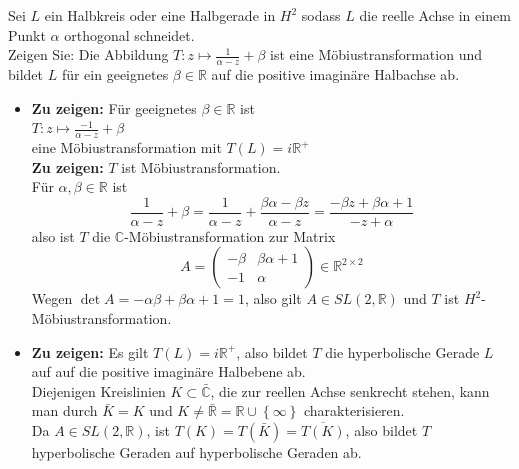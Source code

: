 \begin{assignment}
  Sei $L$ ein Halbkreis oder eine Halbgerade in $H^2$ sodass $L$ die reelle Achse in einem Punkt $\alpha$ orthogonal schneidet. \\
  Zeigen Sie: Die Abbildung $T: z \mapsto \frac{1}{\alpha - z} + \beta$ ist eine Möbiustransformation und bildet $L$  für ein geeignetes  $\beta \in \mathbb{R}$ auf die positive imaginäre Halbachse ab.
\end{assignment}
\begin{solution}
\begin{itemize}
  \item \textbf{Zu zeigen:} Für geeignetes \( \beta \in \mathbb{R} \) ist \\
  \( T: z \mapsto \frac{-1}{\alpha - z} + \beta \) \\
  eine Möbiustransformation mit \( T(L) = i \mathbb{R}^{+} \) \\
  \textbf{Zu zeigen:} \( T \) ist Möbiustransformation. \\
  Für \( \alpha, \beta \in \mathbb{R} \) ist
  \begin{equation*}
    \frac{1}{\alpha -z} + \beta = \frac{1}{\alpha-z} + \frac{\beta \alpha - \beta z}{\alpha - z} = \frac{-\beta z + \beta \alpha + 1}{-z +\alpha}
  \end{equation*} 
  also ist \( T \) die \( \mathbb{C} \)-Möbiustransformation zur Matrix
  \begin{equation*}
    A = \begin{pmatrix}
      - \beta & \beta \alpha + 1 \\
      - 1 & \alpha 
    \end{pmatrix} \in \mathbb{R}^{2 \times 2}
  \end{equation*}
  Wegen \( \det A = - \alpha \beta + \beta \alpha + 1 = 1 \), also gilt \( A \in SL(2, \mathbb{R}) \) und \( T \) ist \( H^2 \)-Möbiustransformation.
  \item   \textbf{Zu zeigen:} Es gilt \( T(L) = i \mathbb{R}^{+} \), also bildet \( T \) die hyperbolische Gerade \( L \) auf auf die positive imaginäre Halbebene ab. \\
  Diejenigen Kreislinien \( K \subset \bar{\mathbb{C}} \), die zur reellen Achse senkrecht stehen, kann man durch \( \bar{K} = K \) und \( K \neq \bar{\mathbb{R}} = \mathbb{R} \cup \left \{ \infty \right \} \) charakterisieren. \\
  Da \( A \in SL(2, \mathbb{R}) \), ist \( T(K) = T(\bar{K}) = \overline{T(K)} \), also bildet \( T \) hyperbolische Geraden auf hyperbolische Geraden ab. \\

\end{itemize}
\end{solution}
